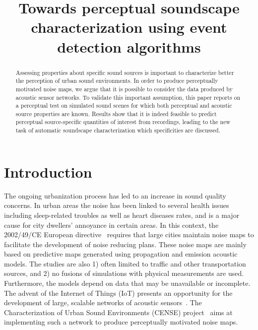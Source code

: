 \documentclass{article}
\title{Towards perceptual soundscape characterization using event detection algorithms}
\begin{document}
\ninept
\maketitle

\begin{sloppy}

\begin{abstract}
Assessing properties about specific sound sources is important to  characterize better the perception of urban sound environments. In order to produce perceptually motivated noise maps, we argue that it is possible to consider the data produced by acoustic sensor networks. To validate this important assumption, this paper reports on a perceptual test on simulated sound scenes for which both perceptual and acoustic source properties are known. Results show that it is indeed feasible to predict perceptual source-specific quantities of interest from recordings, leading to the new task of automatic soundscape characterization which specificities are discussed.

\end{abstract}

\begin{keywords}
\end{keywords}

\section{Introduction}
\label{sec:intro}

The ongoing urbanization process has led to an increase in sound quality concerns. In urban areas the noise has been linked to several health issues including sleep-related troubles as well as heart diseases rates, and is a major cause for city dwellers' annoyance in certain areas. In this context, the 2002/49/CE European directive~\cite{ec2002} requires that large cities maintain noise maps to facilitate the development of noise reducing plans. These noise maps are mainly based on predictive maps generated using propagation and emission acoustic models. The studies are also 1) often limited to traffic and other transportation sources, and 2) no fusions of simulations with physical measurements are used. Furthermore, the models depend on data that may be unavailable or incomplete. The advent of the Internet of Things (IoT) presents an opportunity for the development of large, scalable networks of acoustic sensors~\cite{mydlarz2017, gontier2017}. The Characterization of Urban Sound Environments (CENSE) project~\cite{picault2017} aims at implementing such a network to produce perceptually motivated noise maps.



\end{sloppy}
\end{document}
